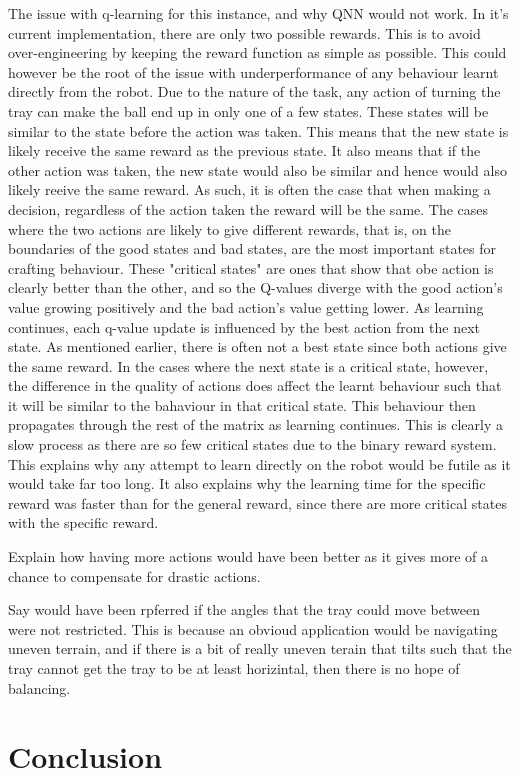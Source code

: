 \documentclass[12pt,a4paper]{article}
\begin{document}
The issue with q-learning for this instance, and why QNN would not work. In it's current implementation, there are only two possible rewards. This is to avoid over-engineering by keeping the reward function as simple as possible. This could however be the root of the issue with underperformance of any behaviour learnt directly from the robot. Due to the nature of the task, any action of turning the tray can make the ball end up in only one of a few states. These states will be similar to the state before the action was taken. This means that the new state is likely receive the same reward as the previous state. It also means that if the other action was taken, the new state would also be similar and hence would also likely reeive the same reward. As such, it is often the case that when making a decision, regardless of the action taken the reward will be the same. The cases where the two actions are likely to give different rewards, that is, on the boundaries of the good states and bad states, are the most important states for crafting behaviour. These "critical states" are ones that show that obe action is clearly better than the other, and so the Q-values diverge with the good action's value growing positively and the bad action's value getting lower. As learning continues, each q-value update is influenced by the best action from the next state. As mentioned earlier, there is often not a best state since both actions give the same reward. In the cases where the next state is a critical state, however, the difference in the quality of actions does affect the learnt behaviour such that it will be similar to the bahaviour in that critical state. This behaviour then propagates through the rest of the matrix as learning continues. This is clearly a slow process as there are so few critical states due to the binary reward system. This explains why any attempt to learn directly on the robot would be futile as it would take far too long. It also explains why the learning time for the specific reward was faster than for the general reward, since there are more critical states with the specific reward.

Explain how having more actions would have been better as it gives more of a chance to compensate for drastic actions. 

Say would have been rpferred if the angles that the tray could move between were not restricted. This is because an obvioud application would be navigating uneven terrain, and if there is a bit of really uneven terain that tilts such that the tray cannot get the tray to be at least horizintal, then there is no hope of balancing. 

\section{Conclusion}



\end{document}
